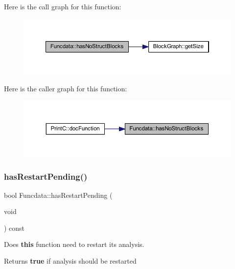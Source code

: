 Here is the call graph for this function\+:
\nopagebreak
\begin{figure}[H]
\begin{center}
\leavevmode
\includegraphics[width=350pt]{class_funcdata_a6840fba2eb01394e02fed1d4b9f77b04_cgraph}
\end{center}
\end{figure}
Here is the caller graph for this function\+:
\nopagebreak
\begin{figure}[H]
\begin{center}
\leavevmode
\includegraphics[width=350pt]{class_funcdata_a6840fba2eb01394e02fed1d4b9f77b04_icgraph}
\end{center}
\end{figure}
\mbox{\label{class_funcdata_ae349f4a44febd9dd27ca63f7f8840103}} 
\subsubsection{\texorpdfstring{hasRestartPending()}{hasRestartPending()}}
{\footnotesize\ttfamily bool Funcdata\+::has\+Restart\+Pending (\begin{DoxyParamCaption}\item[{void}]{ }\end{DoxyParamCaption}) const\hspace{0.3cm}{\ttfamily [inline]}}



Does {\bfseries{this}} function need to restart its analysis. 

\begin{DoxyReturn}{Returns}
{\bfseries{true}} if analysis should be restarted 
\end{DoxyReturn}


